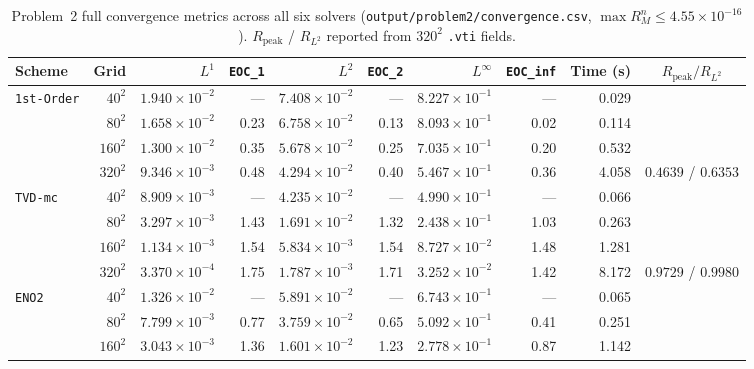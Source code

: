 \documentclass[11pt,a4paper]{article}
\newcommand{\code}[1]{\texttt{#1}}
\theoremstyle{definition}
\begin{document}
\begin{table}[h]
\centering\scriptsize\setlength{\tabcolsep}{3.8pt}\renewcommand{\arraystretch}{0.95}
\caption{Problem~2 full convergence metrics across all six solvers (\code{output/problem2/convergence.csv}, $\max R_M^n \le 4.55\times 10^{-16}$). $R_{\text{peak}}$ / $R_{L^2}$ reported from $320^2$ \code{.vti} fields.}
\label{tab:p2}
\begin{tabular}{@{}lrrrrrrrrc@{}}
\toprule
\textbf{Scheme} & \textbf{Grid} & $L^1$ & \code{EOC\_1} & $L^2$ & \code{EOC\_2} & $L^\infty$ & \code{EOC\_inf} & \textbf{Time (s)} & $R_{\text{peak}} / R_{L^2}$ \\
\midrule
\code{1st-Order} & $40^2$  & $1.940\times 10^{-2}$ & ---  & $7.408\times 10^{-2}$ & ---  & $8.227\times 10^{-1}$ & ---  & 0.029 & \\
                 & $80^2$  & $1.658\times 10^{-2}$ & 0.23 & $6.758\times 10^{-2}$ & 0.13 & $8.093\times 10^{-1}$ & 0.02 & 0.114 & \\
                 & $160^2$ & $1.300\times 10^{-2}$ & 0.35 & $5.678\times 10^{-2}$ & 0.25 & $7.035\times 10^{-1}$ & 0.20 & 0.532 & \\
                 & $320^2$ & $9.346\times 10^{-3}$ & 0.48 & $4.294\times 10^{-2}$ & 0.40 & $5.467\times 10^{-1}$ & 0.36 & 4.058 & $0.4639$ / $0.6353$ \\
\midrule
\code{TVD-mc}    & $40^2$  & $8.909\times 10^{-3}$ & ---  & $4.235\times 10^{-2}$ & ---  & $4.990\times 10^{-1}$ & ---  & 0.066 & \\
                 & $80^2$  & $3.297\times 10^{-3}$ & 1.43 & $1.691\times 10^{-2}$ & 1.32 & $2.438\times 10^{-1}$ & 1.03 & 0.263 & \\
                 & $160^2$ & $1.134\times 10^{-3}$ & 1.54 & $5.834\times 10^{-3}$ & 1.54 & $8.727\times 10^{-2}$ & 1.48 & 1.281 & \\
                 & $320^2$ & $3.370\times 10^{-4}$ & 1.75 & $1.787\times 10^{-3}$ & 1.71 & $3.252\times 10^{-2}$ & 1.42 & 8.172 & $0.9729$ / $0.9980$ \\
\midrule
\code{ENO2}      & $40^2$  & $1.326\times 10^{-2}$ & ---  & $5.891\times 10^{-2}$ & ---  & $6.743\times 10^{-1}$ & ---  & 0.065 & \\
                 & $80^2$  & $7.799\times 10^{-3}$ & 0.77 & $3.759\times 10^{-2}$ & 0.65 & $5.092\times 10^{-1}$ & 0.41 & 0.251 & \\
                 & $160^2$ & $3.043\times 10^{-3}$ & 1.36 & $1.601\times 10^{-2}$ & 1.23 & $2.778\times 10^{-1}$ & 0.87 & 1.142 & \\

\end{tabular}
\end{table}
\end{document}
